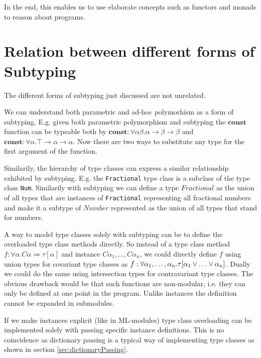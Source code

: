 In the end, this enables us to use elaborate concepts such as functors and monads to reason about programs.

\cite{wadlerblott}

\section{Relation between different forms of Subtyping}\label{sec:relations}

The different forms of subtyping just discussed are not unrelated.

We can understand both parametric and ad-hoc polymorhism as a form of subtyping.
E.g. given both parametric polymorphism and subtyping the $\mathbf{const}$ function can be typeable both by
$\mathbf{const} : \forall \alpha \beta. \alpha \to \beta \to \beta$ and $\mathbf{const} : \forall \alpha. \top \to \alpha \to \alpha$.
Now there are two ways to substitute any type for the first argument of the function.

Similarily, the hierarchy of type classes can express a similar relationship exhibited by subtyping.
E.g. the \texttt{Fractional} type class is a subclass of the type class \texttt{Num}.
Similarily with subtyping we can define a type $\mathit{Fractional}$ as the union of all types that are instances of \texttt{Fractional} representing all fractional numbers and make it a subtype of $\mathit{Number}$ represented as the union of all types that stand for numbers.

A way to model type classes solely with subtyping can be to define the overloaded type class methods directly.
So instead of a type class method $f : \forall \alpha. C \alpha \Rightarrow \tau[\alpha]$ and instance $C \alpha_1, \dots, C \alpha_n$,
we could directly define $f$ using union types for covariant type classes as $f : \forall \alpha_1,\dots,\alpha_n. \tau[\alpha_1 \join \dots \join \alpha_n]$.
Dually we could do the same using intersection types for contravariant type classes.
The obvious drawback would be that such functions are non-modular, i.e. they can only be defined at one point in the program.
Unlike instances the definition cannot be expanded in submodules.

If we make instances explicit (like in ML-modules) type class overloading can be implemented solely with passing specific instance definitions.
This is no coincidence as dictionary passing is a typical way of implementing type classes as shown in section \ref{sec:dictionaryPassing}.

